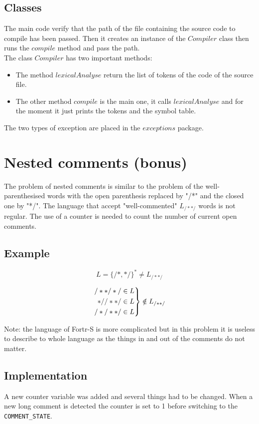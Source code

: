 \documentclass{article}
\begin{document}
\subsection{Classes}
\hspace{0.5cm} The main code verify that the path of the file containing the source code to compile has been passed. Then it creates an instance of the $Compiler$ class then runs the $compile$ method and pass the path.\\

The class $Compiler$ has two important methods:
\begin{itemize}
\item The method $lexicalAnalyse$ return the list of tokens of the code of the source file.
\item The other method $compile$ is the main one, it calls $lexicalAnalyse$ and for the moment it just prints the tokens and the symbol table.
\end{itemize}

The two types of exception are placed in the $exceptions$ package.

\section{Nested comments (bonus)}
The problem of nested comments is similar to the problem of the well-parenthesised words with the open parenthesis replaced by "/*" and the closed one by "*/". The language that accept "well-commented" $L_{/**/}$ words is not regular. The use of a counter is needed to count the number of current open comments.

\subsection{Example}
$$
L = \{/*,*/\}^* \ne L_{/**/}
$$

\begin{equation}
  \notag
  \left.\begin{aligned}
  /**/*/\in L\\
  *//**/\in L\\
  /*/**/\in L
\end{aligned}\right\} \notin L_{/**/}
\end{equation}

Note: the language of Fortr-S is more complicated but in this problem it is useless to describe to whole language as the things in and out of the comments do not matter.

\subsection{Implementation}
A new counter variable was added and several things had to be changed.
When a new long comment is detected the counter is set to 1 before switching to the \texttt{COMMENT\_STATE}.\\
\end{document}
